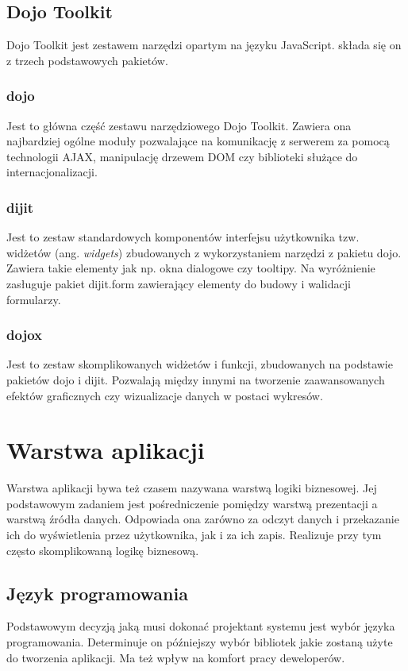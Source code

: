 \subsection[Dojo Toolkit][Dojo Toolkit]{Dojo Toolkit}
Dojo Toolkit jest zestawem narzędzi opartym na języku JavaScript. składa się on z trzech podstawowych pakietów.

\subsubsection[dojo][dojo]{dojo}
Jest to główna część zestawu narzędziowego Dojo Toolkit. Zawiera ona najbardziej ogólne moduły pozwalające na komunikację z serwerem za pomocą technologii AJAX, manipulację drzewem DOM czy biblioteki służące do internacjonalizacji.

\subsubsection[dijit][dijit]{dijit}
Jest to zestaw standardowych komponentów interfejsu użytkownika tzw. widżetów (ang. \textit{widgets}) zbudowanych z wykorzystaniem narzędzi z pakietu dojo. Zawiera takie elementy jak np. okna dialogowe czy tooltipy. Na wyróżnienie zasługuje pakiet dijit.form zawierający elementy do budowy i walidacji formularzy.
 
\subsubsection[dojox][dojox]{dojox}
Jest to zestaw skomplikowanych widżetów i funkcji, zbudowanych na podstawie pakietów dojo i dijit. Pozwalają między innymi na tworzenie zaawansowanych efektów graficznych czy wizualizacje danych w postaci wykresów.
 
\section[Warstwa aplikacji][Warstwa aplikacji]{Warstwa aplikacji}
Warstwa aplikacji bywa też czasem nazywana warstwą logiki biznesowej. Jej podstawowym zadaniem jest pośredniczenie pomiędzy warstwą prezentacji a warstwą źródła danych. Odpowiada ona zarówno za odczyt danych i przekazanie ich do wyświetlenia przez użytkownika, jak i za ich zapis. Realizuje przy tym często skomplikowaną logikę biznesową.

\subsection[Język programowania][Język programowania]{Język programowania}
Podstawowym decyzją jaką musi dokonać projektant systemu jest wybór języka programowania. Determinuje on późniejszy wybór bibliotek jakie zostaną użyte do tworzenia aplikacji. Ma też wpływ na komfort pracy deweloperów.

